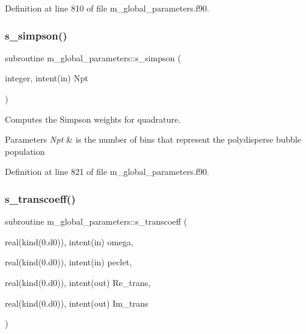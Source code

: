Definition at line 810 of file m\+\_\+global\+\_\+parameters.\+f90.

\mbox{\label{namespacem__global__parameters_a78f4bf8bb59af4396bf11aca330463ec}} 
\subsubsection{\texorpdfstring{s\+\_\+simpson()}{s\_simpson()}}
{\footnotesize\ttfamily subroutine m\+\_\+global\+\_\+parameters\+::s\+\_\+simpson (\begin{DoxyParamCaption}\item[{integer, intent(in)}]{Npt }\end{DoxyParamCaption})}



Computes the Simpson weights for quadrature. 


\begin{DoxyParams}{Parameters}
{\em Npt} & is the number of bins that represent the polydisperse bubble population \\
\hline
\end{DoxyParams}


Definition at line 821 of file m\+\_\+global\+\_\+parameters.\+f90.

\mbox{\label{namespacem__global__parameters_af52b102f1c17e28aa4ca3070f8806ca6}} 
\subsubsection{\texorpdfstring{s\+\_\+transcoeff()}{s\_transcoeff()}}
{\footnotesize\ttfamily subroutine m\+\_\+global\+\_\+parameters\+::s\+\_\+transcoeff (\begin{DoxyParamCaption}\item[{real(kind(0.d0)), intent(in)}]{omega,  }\item[{real(kind(0.d0)), intent(in)}]{peclet,  }\item[{real(kind(0.d0)), intent(out)}]{Re\+\_\+trans,  }\item[{real(kind(0.d0)), intent(out)}]{Im\+\_\+trans }\end{DoxyParamCaption})}




